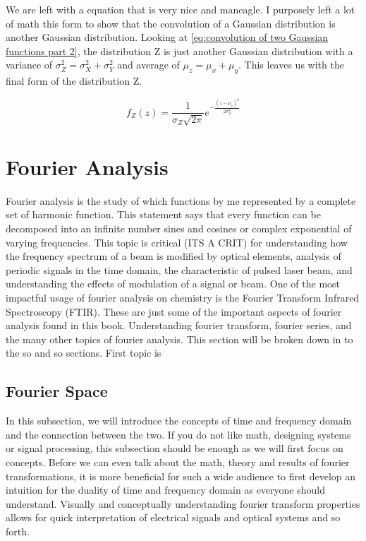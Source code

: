 \documentclass[11pt,a4paper]{book}
\begin{document}
		We are left with a equation that is very nice and maneagle. I purposely left a lot of math this form to show that the convolution of a Gaussian distribution is another Gaussian distribution. Looking at \autoref{eq:convolution of two Gaussian functions part 2}, the distribution Z is just another Gaussian distribution with a variance of $\sigma_Z^2 = \sigma_X^2 + \sigma_Y^2$ and average of $\mu_z = \mu_x + \mu_y$. This leaves us with the final form of the distribution Z.
		
		\begin{equation}
			f_Z(z) = \dfrac{1}{\sigma_Z \sqrt{2 \pi}} e^{-\frac{\left( z - \mu_z \right)^2}{2 \sigma_Z^2}}
		\end{equation}
		
	\section{Fourier Analysis}
		\label{sec:Fourier Analysis}
		Fourier analysis is the study of which functions by me represented by a complete set of harmonic function. This statement says that every function can be decomposed into an infinite number sines and cosines or complex exponential of varying frequencies.  This topic is critical (ITS A CRIT) for understanding how the frequency spectrum of a beam is modified by optical elements, analysis of periodic signals in the time domain, the characteristic of pulsed laser beam, and understanding the effects of modulation of a signal or beam. One of the most impactful usage of fourier analysis on chemistry is the Fourier Transform Infrared Spectroscopy (FTIR). These are just some of the important aspects of fourier analysis found in this book. Understanding fourier transform, fourier series, and the many other topics of fourier analysis. This section will be broken down in to the so and so sections. First topic is 
		
		\subsection{Fourier Space}
			\label{subsec:Fourier Series}
			In this subsection, we will introduce the concepts of time and frequency domain and the connection between the two. If you do not like math, designing systems or signal processing, this subsection should be enough as we will first focus on concepts. Before we can even talk about the math, theory and results of fourier transformations, it is more beneficial for such a wide audience to first develop an intuition for the duality of time and frequency domain as everyone should understand. Visually and conceptually understanding fourier transform properties allows for quick interpretation of electrical signals and optical systems and so forth.
			
\end{document}
